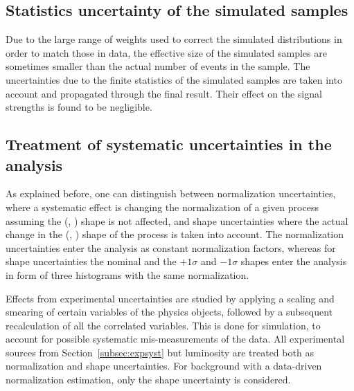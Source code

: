 \subsection{Statistics uncertainty of the simulated samples}

Due to the large range of weights used to correct the simulated distributions in order to
match those in data, the effective size of the simulated samples are sometimes smaller than
the actual number of events in the sample.
The uncertainties due to the finite statistics of the simulated samples are taken into account and propagated through the final result. Their effect on the signal strengths is found to be negligible.

\subsection{Treatment of systematic uncertainties in the analysis}\label{sec:syst_treatment}

As explained before, one can distinguish between normalization uncertainties, where a systematic effect is changing the normalization of a given process assuming the (\mll, \mt) shape is not affected, and shape uncertainties where the actual change in the (\mll, \mt) shape of the process is taken into account. The normalization uncertainties enter the analysis as constant normalization factors, whereas for shape uncertainties the nominal and the $+1\sigma$ and $-1\sigma$ shapes enter the analysis in form of three histograms with the same normalization. 

Effects from experimental uncertainties are studied by applying a scaling and smearing of certain variables of the physics objects, followed by a subsequent recalculation of all the correlated variables. This is done for simulation, to account for possible systematic mis-measurements of the data. All experimental sources from Section~\ref{subsec:expsyst} but luminosity are treated both as normalization and shape uncertainties. For background with a data-driven normalization estimation, only the shape uncertainty is considered.
